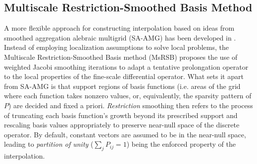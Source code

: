\subsection{Multiscale Restriction-Smoothed Basis Method}
\label{subsec:related_work_msrsb}

A more flexible approach for constructing interpolation based on ideas from smoothed aggregation alebraic multigrid (SA-AMG) has been developed in \cite{Moyner2016}.   Instead of employing localization assumptions to solve local problems, the Multiscale Restriction-Smoothed Basis method (MsRSB) proposes the use of weighted Jacobi smoothing iterations to adapt a tentative prolongation operator to the local properties of the fine-scale differential operator.   What sets it apart from SA-AMG is that support regions of basis functions (i.e. areas of the grid where each function takes nonzero values, or, equivalently, the sparsity pattern of $P$) are decided and fixed a priori. \textit{Restriction} smoothing then refers to the process of truncating each basis function's growth beyond its prescribed support and rescaling basis values appropriately to preserve near-null space of the discrete operator.   By default, constant vectors are assumed to be in the near-null space, leading to \textit{partition of unity} ($\sum_j P_{ij} = 1$) being the enforced property of the interpolation.

